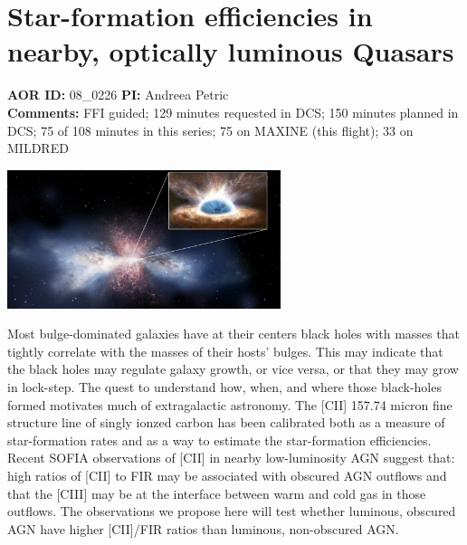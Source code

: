 \documentclass[10pt]{article}
\begin{document}
\section{Star-formation efficiencies in nearby, optically luminous Quasars}
{\large {\bf AOR ID:} 08\_0226 {\bf PI:} Andreea Petric}\\
{\bf Comments:} FFI guided;  129 minutes requested in DCS;  150 minutes planned in DCS;  75 of 108 minutes in this series;  75 on MAXINE (this flight);  33 on MILDRED\\
\begin{center}
\includegraphics[width=0.60\textwidth]{../test/08_0226/1.png}
\end{center}
Most bulge-dominated galaxies have at their centers black holes with masses that tightly correlate with the masses of their hosts' bulges. This may indicate that the black holes may regulate galaxy growth, or vice versa, or that they may grow in lock-step. The quest to understand how, when, and where those black-holes formed motivates much of extragalactic astronomy. The [CII] 157.74 micron fine structure line of singly ionzed carbon has been calibrated  both as a measure of star-formation rates and as a way to estimate the star-formation efficiencies. Recent SOFIA observations of  [CII] in nearby low-luminosity AGN suggest that: high ratios of [CII] to FIR may be associated with obscured AGN outflows and that the [CIII] may be at the interface between warm and cold gas in those outflows. The observations we propose here will test whether luminous, obscured AGN have higher [CII]/FIR ratios than luminous, non-obscured AGN.
\end{document}
